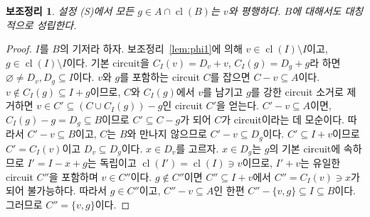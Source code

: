 \documentclass[11pt,a4paper]{article}
\theoremstyle{plain}
\newtheorem{lemma}[theorem]{보조정리}
\theoremstyle{definition}
\newcommand{\cl}{\operatorname{cl}}
\begin{document}
\begin{lemma}\label{lem:A}
설정 (S)에서 모든 $g\in A\cap\cl(B)$는 $v$와 평행하다. $B$에 대해서도 대칭적으로 성립한다.
\end{lemma}
\begin{proof}
$I$를 $B$의 기저라 하자. 보조정리~\ref{lem:phi1}에 의해 $v\in\cl(I)\setminus I$이고, $g\in\cl(I)\setminus I$이다. 기본 circuit을 $C_I(v)=D_v+v$, $C_I(g)=D_g+g$라 하면 $\varnothing\ne D_v,D_g\subseteq I$이다. $v$와 $g$를 포함하는 circuit $C$를 잡으면 $C-v\subseteq A$이다. $v\notin C_I(g)\subseteq I+g$이므로, $C$와 $C_I(g)$에서 $v$를 남기고 $g$를 강한 circuit 소거로 제거하면 $v\in C'\subseteq(C\cup C_I(g))-g$인 circuit $C'$을 얻는다. $C'-v\subseteq A$이면, $C_I(g)-g=D_g\subseteq B$이므로 $C'\subseteq C-g$가 되어 $C$가 circuit이라는 데 모순이다. 따라서 $C'-v\subseteq B$이고, $C$는 $B$와 만나지 않으므로 $C'-v\subseteq D_g$이다. $C'\subseteq I+v$이므로 $C'=C_I(v)$이고 $D_v\subseteq D_g$이다. $x\in D_v$를 고르자. $x\in D_g$는 $g$의 기본 circuit에 속하므로 $I'=I-x+g$는 독립이고 $\cl(I')=\cl(I)\ni v$이므로, $I'+v$는 유일한 circuit $C''$을 포함하며 $v\in C''$이다. $g\notin C''$이면 $C''\subseteq I+v$에서 $C''=C_I(v)\ni x$가 되어 불가능하다. 따라서 $g\in C''$이고, $C''-v\subseteq A$인 한편 $C''-\{v,g\}\subseteq I\subseteq B$이다. 그러므로 $C''=\{v,g\}$이다.
\end{proof}
\end{document}
